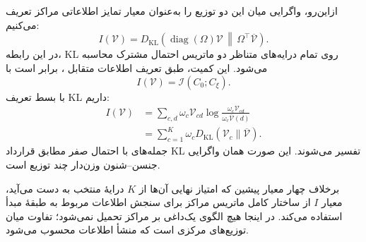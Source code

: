 ازاین‌رو، واگرایی میان این دو توزیع را به‌عنوان
معیار تمایز اطلاعاتی مراکز تعریف می‌کنیم:
\begin{equation}\label{cmp:eq:ch3-center-information-matrix}
\boxed{
I(\mathcal V)=D_{\mathrm{KL}}\!\left(
\operatorname{diag}(\Omega)\mathcal V
\,\middle\|\,
\Omega^\top\overline{\mathcal V}
\right).
}
\end{equation}
در این رابطه، KL روی تمام درایه‌های متناظر
دو ماتریس احتمال مشترک محاسبه می‌شود. این
کمیت، طبق تعریف اطلاعات متقابل
\cite{CoverThomas2006}، برابر است با
\begin{equation}\label{cmp:eq:ch3-center-channel-mutual-information}
I(\mathcal V)=\mathcal I(C_0;C_\xi).
\end{equation}
با بسط تعریف KL داریم:
\begin{equation}\label{cmp:eq:ch3-center-information-separation}
\begin{aligned}
I(\mathcal V)
&=\sum_{c,d}\omega_c\mathcal V_{cd}
\log\frac{\omega_c\mathcal V_{cd}}
{\omega_c\overline{\mathcal V}(d)}\\
&=\sum_{c=1}^{K}\omega_c
D_{\mathrm{KL}}(\mathcal V_c\|\overline{\mathcal V}).
\end{aligned}
\end{equation}
جمله‌های با احتمال صفر مطابق قرارداد KL تفسیر
می‌شوند. این صورت همان واگرایی جنسن--شنون
وزن‌دار چند توزیع است.

برخلاف چهار معیار پیشین که امتیاز نهایی آن‌ها
از $K$ درایهٔ منتخب به دست می‌آید، معیار $I$
از ساختار کامل ماتریس مراکز برای سنجش اطلاعات
مربوط به طبقهٔ مبدأ استفاده می‌کند. در اینجا
هیچ الگوی یک‌داغی بر مراکز تحمیل نمی‌شود؛
تفاوت میان توزیع‌های مرکزی است که منشأ اطلاعات
محسوب می‌شود.

